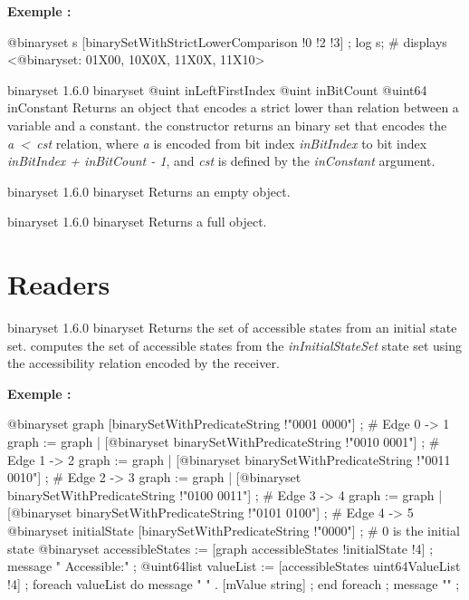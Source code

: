 \textbf{Exemple :}
\begin{galgascode}
@binaryset s [binarySetWithStrictLowerComparison !0 !2 !3] ;
log s; # displays <@binaryset: 01X00, 10X0X, 11X0X, 11X10>
\end{galgascode}





{binaryset}
{1.6.0}
{binaryset}
{@uint inLeftFirstIndex}
{@uint inBitCount}
{@uint64 inConstant}
{Returns an  object that encodes a strict lower than relation between a variable and a constant.}
{the constructor returns an binary set that encodes the \emph{a~<~cst} relation, where \emph {a} is encoded from bit index \emph{inBitIndex} to bit index \emph{inBitIndex  + inBitCount - 1}, and \emph{cst} is defined by the \emph{inConstant} argument.}





{binaryset}
{1.6.0}
{binaryset}
{Returns an empty  object.}
{}





{binaryset}
{1.6.0}
{binaryset}
{Returns a full  object.}
{}


\section{Readers}



{binaryset}
{1.6.0}
{binaryset}
{Returns the set of accessible states from an initial state set.}
{computes the set of accessible states from the \emph{inInitialStateSet} state set using the accessibility relation encoded by the receiver.}

\textbf{Exemple :}
\begin{galgascode}
@binaryset graph [binarySetWithPredicateString !"0001 0000"] ; # Edge 0 -> 1
graph := graph | [@binaryset binarySetWithPredicateString !"0010 0001"] ; # Edge 1 -> 2
graph := graph | [@binaryset binarySetWithPredicateString !"0011 0010"] ; # Edge 2 -> 3
graph := graph | [@binaryset binarySetWithPredicateString !"0100 0011"] ; # Edge 3 -> 4
graph := graph | [@binaryset binarySetWithPredicateString !"0101 0100"] ; # Edge 4 -> 5
@binaryset initialState [binarySetWithPredicateString !"0000"] ; # 0 is the initial state
@binaryset accessibleStates := [graph accessibleStates !initialState !4] ;
message " Accessible:" ;
@uint64list valueList := [accessibleStates uint64ValueList !4] ;
foreach valueList do
  message " " . [mValue string] ;
end foreach ;
message "\n" ;
\end{galgascode}


